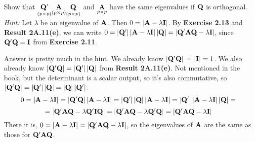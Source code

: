         Show that $\underset{\left(p \times p\right)}{\bold{Q}^\prime} \underset{\left(p \times p\right)}{\bold{A}} \underset{\left(p \times p\right)}{\bold{Q}}$ and $\underset{p \times p}{\bold{A}}$ have the same eigenvalues if $\bold{Q}$ is orthogonal.
        \newline
        \textit{Hint:} Let $\lambda$ be an eigenvalue of $\bold{A}$. Then $0 = \left|\bold{A} - \lambda \bold{I}\right|$. By \textbf{Exercise 2.13} and \textbf{Result 2A.11(e)}, we can write $0 = \left|\bold{Q}^\prime\right|\left|\bold{A} - \lambda \bold{I}\right| \left|\bold{Q}\right| = \left|\bold{Q}^\prime \bold{A} \bold{Q} - \lambda\bold{I}\right|$, since $\bold{Q}^\prime \bold{Q} = \bold{I}$ from \textbf{Exercise 2.11}.
        \par
        Answer is pretty much in the hint. We already know $\left|\bold{Q}^\prime\bold{Q}\right|$ = $\left|\bold{I}\right| = 1$. We also already know $\left|\bold{Q}^\prime\bold{Q}\right| = \left|\bold{Q}^\prime\right|\left|\bold{Q}\right|$ from \textbf{Result 2A.11(e)}. Not mentioned in the book, but the determinant is a scalar output, so it's also commutative, so $\left|\bold{Q}^\prime\bold{Q}\right| = \left|\bold{Q}^\prime\right|\left|\bold{Q}\right| = \left|\bold{Q}\right|\left|\bold{Q}^\prime\right|$.
        \[
            0
            =
            \left|\bold{A} - \lambda \bold{I}\right|
            =
            \left|\bold{Q}^\prime\bold{Q}\right|
            \left|\bold{A} - \lambda \bold{I}\right|
            =
            \left|\bold{Q}^\prime\right|
            \left|\bold{Q}\right|
            \left|\bold{A} - \lambda \bold{I}\right|
            =
            \left|\bold{Q}^\prime\right|
            \left|\bold{A} - \lambda \bold{I}\right|
            \left|\bold{Q}\right|
            =
        \]
        \[
            =
            \left|\bold{Q}^\prime\bold{A}\bold{Q} - \lambda \bold{Q}^\prime\bold{I}\bold{Q}\right|
            =
            \left|\bold{Q}^\prime\bold{A}\bold{Q} - \lambda \bold{Q}^\prime\bold{Q}\right|
            =
            \left|\bold{Q}^\prime\bold{A}\bold{Q} - \lambda \bold{I}\right|
        \]
        There it is, $0 = \left|\bold{A} - \lambda \bold{I}\right| = \left|\bold{Q}^\prime\bold{A}\bold{Q} - \lambda \bold{I}\right|$, so the eigenvalues of $\bold{A}$ are the same as those for $\bold{Q}^\prime\bold{A}\bold{Q}$.